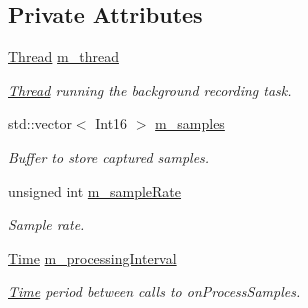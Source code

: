 \subsection*{Private Attributes}
\begin{DoxyCompactItemize}
\item 
\mbox{\label{classsf_1_1_sound_recorder_aa61a5840d98b18e1f74a4dbd9e329cc3}} 
\mbox{\hyperlink{classsf_1_1_thread}{Thread}} \mbox{\hyperlink{classsf_1_1_sound_recorder_aa61a5840d98b18e1f74a4dbd9e329cc3}{m\+\_\+thread}}
\begin{DoxyCompactList}\small\item\em \mbox{\hyperlink{classsf_1_1_thread}{Thread}} running the background recording task. \end{DoxyCompactList}\item 
\mbox{\label{classsf_1_1_sound_recorder_a2380449ff05efe7602a8dceb4e24bf4c}} 
std\+::vector$<$ Int16 $>$ \mbox{\hyperlink{classsf_1_1_sound_recorder_a2380449ff05efe7602a8dceb4e24bf4c}{m\+\_\+samples}}
\begin{DoxyCompactList}\small\item\em Buffer to store captured samples. \end{DoxyCompactList}\item 
\mbox{\label{classsf_1_1_sound_recorder_a5b318ed67b9cdfdc35bbcbaf3e9ea6da}} 
unsigned int \mbox{\hyperlink{classsf_1_1_sound_recorder_a5b318ed67b9cdfdc35bbcbaf3e9ea6da}{m\+\_\+sample\+Rate}}
\begin{DoxyCompactList}\small\item\em Sample rate. \end{DoxyCompactList}\item 
\mbox{\label{classsf_1_1_sound_recorder_a76d2b226244488bc92d870a1ba9c470a}} 
\mbox{\hyperlink{classsf_1_1_time}{Time}} \mbox{\hyperlink{classsf_1_1_sound_recorder_a76d2b226244488bc92d870a1ba9c470a}{m\+\_\+processing\+Interval}}
\begin{DoxyCompactList}\small\item\em \mbox{\hyperlink{classsf_1_1_time}{Time}} period between calls to on\+Process\+Samples. \end{DoxyCompactList}\item 
\mbox{\label{classsf_1_1_sound_recorder_a245820535f8b81716a374bdd8dc726bb}} 

\end{DoxyCompactItemize}
